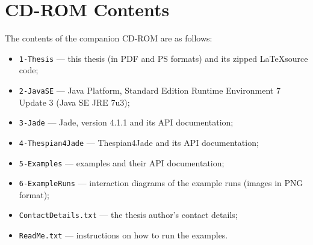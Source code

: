 
\chapter{CD-ROM Contents}

The contents of the companion CD-ROM are as follows:

\begin{itemize}
	\item \texttt{1-Thesis} --- this thesis (in PDF and PS formats) and its zipped \LaTeX source code;
	\item \texttt{2-JavaSE} --- Java Platform, Standard Edition Runtime Environment 7 Update 3 (Java SE JRE 7u3);
	\item \texttt{3-Jade} --- Jade, version 4.1.1 and its API documentation;
	\item \texttt{4-Thespian4Jade} --- Thespian4Jade and its API documentation;
	\item \texttt{5-Examples} --- examples and their API documentation;
	\item \texttt{6-ExampleRuns} --- interaction diagrams of the example runs (images in PNG format);
	\item \texttt{ContactDetails.txt} --- the thesis author's contact details;
	\item \texttt{ReadMe.txt} --- instructions on how to run the examples.
\end{itemize}